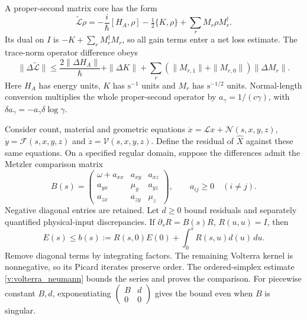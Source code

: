 A proper-second matrix core has the form
\begin{equation}
 \widetilde{\mathcal L}\rho=
 -\frac{i}{\hbar}[H_A,\rho]-\tfrac12\{K,\rho\}
 +\sum_rM_r\rho M_r^\dagger .
 \label{v:positive_core}
\end{equation}
Its dual on $I$ is $-K+\sum_rM_r^\dagger M_r$, so all gain terms enter a net loss estimate. The trace-norm operator difference obeys
\begin{equation}
 \|\Delta\widetilde{\mathcal L}\|\le
 \frac{2\|\Delta H_A\|}{\hbar}+\|\Delta K\|
 +\sum_r(\|M_{r,1}\|+\|M_{r,0}\|)\|\Delta M_r\|.
 \label{v:core_difference}
\end{equation}
Here $H_A$ has energy units, $K$ has $\mathrm{s}^{-1}$ units and $M_r$ has $\mathrm{s}^{-1/2}$ units. Normal-length conversion multiplies the whole proper-second operator by $a_\gamma=1/(c\gamma)$, with $\delta a_\gamma=-a_\gamma\delta\log\gamma$.

Consider count, material and geometric equations
$\dot x=\mathcal Lx+\mathcal N(s,x,y,z)$,
$\dot y=\mathcal F(s,x,y,z)$ and $\dot z=\mathcal V(s,x,y,z)$.
Define the residual of $\widehat X$ against these same equations. On a specified regular domain, suppose the differences admit the Metzler comparison matrix
\begin{equation}
 B(s)=\begin{pmatrix}
 \omega+a_{xx}&a_{xy}&a_{xz}\\
 a_{yx}&\mu_y&a_{yz}\\
 a_{zx}&a_{zy}&\mu_z
 \end{pmatrix},\qquad a_{ij}\ge0\quad(i\ne j).
 \label{v:comparison_matrix}
\end{equation}
Negative diagonal entries are retained. Let $d\ge0$ bound residuals and separately quantified physical-input discrepancies. If $\partial_sR=B(s)R$, $R(u,u)=I$, then
\begin{equation}
 E(s)\le b(s):=R(s,0)E(0)+\int_0^sR(s,u)d(u)\,du .
 \label{v:coupled_bound}
\end{equation}
Remove diagonal terms by integrating factors. The remaining Volterra kernel is nonnegative, so its Picard iterates preserve order. The ordered-simplex estimate \eqref{v:volterra_neumann} bounds the series and proves the comparison. For piecewise constant $B,d$, exponentiating
$\left(\begin{smallmatrix}B&d\\0&0\end{smallmatrix}\right)$ gives the bound even when $B$ is singular.

